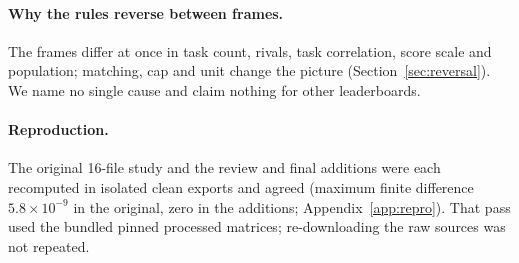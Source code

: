 \paragraph{Why the rules reverse between frames.}
The frames differ at once in task count, rivals, task correlation, score scale and population; matching, cap and unit change the picture (Section~\ref{sec:reversal}). We name no single cause and claim nothing for other leaderboards.

\paragraph{Reproduction.}
The original 16-file study and the review and final additions were each recomputed in isolated clean exports and agreed (maximum finite difference $5.8\times10^{-9}$ in the original, zero in the additions; Appendix~\ref{app:repro}). That pass used the bundled pinned processed matrices; re-downloading the raw sources was not repeated.
